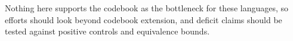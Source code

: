 \documentclass{article}
\begin{document}
Nothing here supports the codebook as the bottleneck for these languages, so efforts should look beyond codebook extension, and deficit claims should be tested against positive controls and equivalence bounds.

\let\oldthebibliography\thebibliography
\renewcommand{\thebibliography}[1]{%
  \oldthebibliography{#1}%
  \setlength{\itemsep}{0pt plus 0.3pt}\setlength{\parsep}{0pt}}

{\ninept

}
\end{document}
